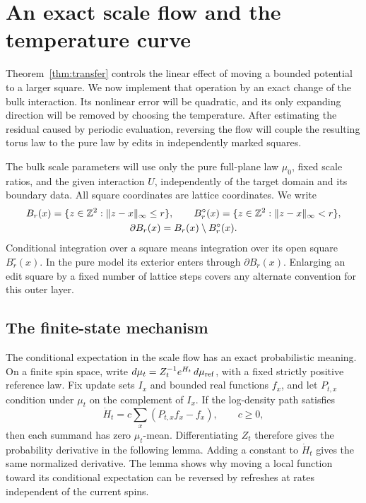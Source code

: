 \section{An exact scale flow and the temperature curve}\label{sec:flow}

Theorem~\ref{thm:transfer} controls the linear effect of moving a bounded
potential to a larger square.  We now implement that operation by an exact
change of the bulk interaction.  Its nonlinear error will be quadratic,
and its only expanding direction will be removed by choosing the temperature.
After estimating the residual caused by periodic evaluation, reversing the
flow will couple the resulting torus law to the pure law by edits in
independently marked squares.

The bulk scale parameters will use only the pure full-plane law
\(\mu _0\), fixed scale ratios, and the given interaction \(U\),
independently of the target domain and its boundary data.  All square
coordinates are lattice coordinates.  We write
\[
 \begin{gathered}
 B_r(x)=\{z\in\mathbb Z^2:\|z-x\|_\infty\le r\},\qquad
 B_r^\circ(x)=\{z\in\mathbb Z^2:\|z-x\|_\infty<r\},\\
 \partial B_r(x)=B_r(x)\setminus B_r^\circ(x).
 \end{gathered}
\]
Conditional integration over a square means integration over its open square
\(B_r^\circ(x)\).  In the pure model its exterior enters through
\(\partial B_r(x)\).  Enlarging an edit square by a fixed number of lattice
steps covers any alternate convention for this outer layer.

\subsection{The finite-state mechanism}

The conditional expectation in the scale flow has an exact probabilistic
meaning.  On a finite spin space, write
$d\mu_t=Z_t^{-1}e^{H_t}\,d\mu_{\rm ref}$, with a fixed strictly positive
reference law.  Fix update sets $I_x$ and bounded real functions $f_x$,
and let $P_{t,x}$ condition under $\mu_t$ on the complement of $I_x$.
If the log-density path satisfies
\[
 \dot H_t=c\sum_x(P_{t,x}f_x-f_x),\qquad c\ge0,
\]
then each summand has zero $\mu_t$-mean.  Differentiating $Z_t$ therefore
gives the probability derivative in the following lemma.  Adding a
constant to $\dot H_t$ gives the same normalized derivative.  The lemma
shows why moving a local function toward its conditional expectation
can be reversed by refreshes at rates independent of the current spins.

